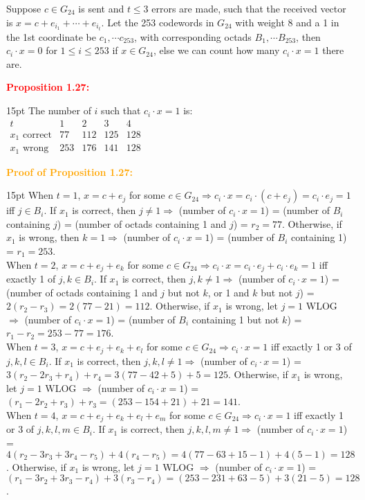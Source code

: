 \documentclass[12pt]{article}
\newcommand{\noparskip}{\vspace{-\parskip}}
\newenvironment{dent}
	{\begin{adjustwidth}{15pt}{}\noparskip}
	{\end{adjustwidth}}
\newenvironment{result}[1]
	{\textcolor{Red}{\textbf{#1:}}\begin{dent}}
	{\end{dent}}
\newenvironment{proof}[1]
	{\textcolor{Orange}{\textbf{Proof of #1:}}\begin{dent}}
	{\end{dent}}
\renewcommand{\implies}{\Rightarrow}
\begin{document}
Suppose $c \in G_{24}$ is sent and $t \le 3$ errors are made, such that the received vector is $x = c + e_{i_1} + \cdots + e_{i_t}$. Let the 253 codewords in $G_{24}$ with weight 8 and a 1 in the 1st coordinate be $c_1, \cdots c_{253}$, with corresponding octads $B_1, \cdots B_{253}$, then $c_i \cdot x = 0$ for $1 \le i \le 253$ if $x \in G_{24}$, else we can count how many $c_i \cdot x = 1$ there are.

\begin{result}{Proposition 1.27}
The number of $i$ such that $c_i \cdot x = 1$ is: \\
$\begin{array}{c|cccc}
t & 1 & 2 & 3 & 4 \\ \hline
x_1 \text{ correct} & 77 & 112 & 125 & 128 \\
x_1 \text{ wrong} & 253 & 176 & 141 & 128
\end{array}$
\end{result}

\begin{proof}{Proposition 1.27}
When $t = 1$, $x = c + e_j$ for some $c \in G_{24} \implies c_i \cdot x = c_i \cdot (c + e_j) = c_i \cdot e_j = 1$ iff $j \in B_i$. 
If $x_1$ is correct, then $j \ne 1 \implies$ (number of $c_i \cdot x = 1$) = (number of $B_i$ containing $j$) = (number of octads containing 1 and $j$) = $r_2 = 77$. 
Otherwise, if $x_1$ is wrong, then $k = 1 \implies$ (number of $c_i \cdot x = 1$) = (number of $B_i$ containing 1) = $r_1 = 253$. \\
When $t = 2$, $x = c + e_j + e_k$ for some $c \in G_{24} \implies c_i \cdot x = c_i \cdot e_j + c_i \cdot e_k = 1$ iff exactly 1 of $j, k \in B_i$. 
If $x_1$ is correct, then $j, k \ne 1 \implies$ (number of $c_i \cdot x = 1$) = (number of octads containing 1 and $j$ but not $k$, or 1 and $k$ but not $j$) = $2(r_2 - r_3) = 2(77 - 21) = 112$. 
Otherwise, if $x_1$ is wrong, let $j = 1$ WLOG $\implies$ (number of $c_i \cdot x = 1$) = (number of $B_i$ containing 1 but not $k$) = $r_1 - r_2 = 253 - 77 = 176$. \\
When $t = 3$, $x = c + e_j + e_k + e_l$ for some $c \in G_{24} \implies c_i \cdot x = 1$ iff exactly 1 or 3 of $j, k, l \in B_i$. 
If $x_1$ is correct, then $j, k, l \ne 1 \implies$ (number of $c_i \cdot x = 1$) = $3(r_2 - 2r_3 + r_4) + r_4 = 3(77 - 42 + 5) + 5 = 125$. 
Otherwise, if $x_1$ is wrong, let $j = 1$ WLOG $\implies$ (number of $c_i \cdot x = 1$) = $(r_1 - 2r_2 + r_3) + r_3 = (253 - 154 + 21) + 21 = 141$. \\
When $t = 4$, $x = c + e_j + e_k + e_l + e_m$ for some $c \in G_{24} \implies c_i \cdot x = 1$ iff exactly 1 or 3 of $j, k, l, m \in B_i$. 
If $x_1$ is correct, then $j, k, l, m \ne 1 \implies$ (number of $c_i \cdot x = 1$) = $4(r_2 - 3r_3 + 3r_4 - r_5) + 4(r_4 - r_5) = 4(77 - 63 + 15 - 1) + 4(5 - 1) = 128$. 
Otherwise, if $x_1$ is wrong, let $j = 1$ WLOG $\implies$ (number of $c_i \cdot x = 1$) = $(r_1 - 3r_2 + 3r_3 - r_4) + 3(r_3 - r_4) = (253 - 231 + 63 - 5) + 3(21 - 5) = 128$.
\end{proof}
\end{document}
